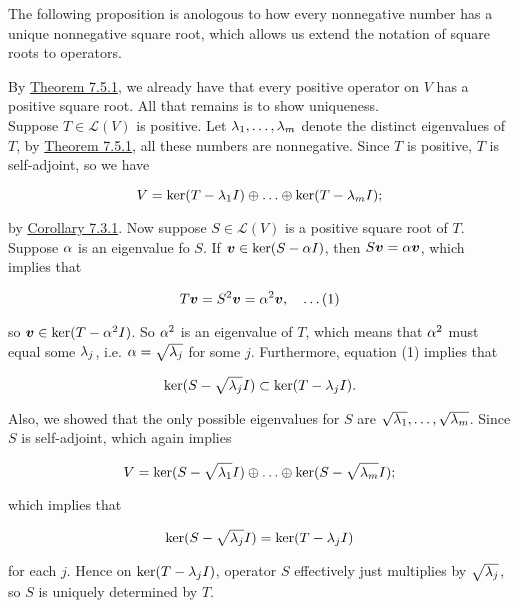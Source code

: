 \documentclass{report}
\newcommand{\cL}{\mathcal{L}}
\begin{document}
	The following proposition is anologous to how every nonnegative number has a unique nonnegative square root, which allows us extend the notation of square roots to operators.
	\vspace{1mm}
	\begin{myproof}
		By \hyperref[sec:Thm751]{Theorem 7.5.1}, we already have that every positive operator on $V$ has a positive square root. All that remains is to show uniqueness.\\
		
		Suppose $T\in\cL(V)$ is positive. Let $\lambda_1,\ldots,\lambda_m$ denote the distinct eigenvalues of $T$, by \hyperref[sec:Thm751]{Theorem 7.5.1}, all these numbers are nonnegative. Since $T$ is positive, $T$ is self-adjoint, so we have
		
		$$V=\ker(T-\lambda_1I)\oplus\ldots\oplus\ker(T-\lambda_mI);$$
		
		by \hyperref[sec:Cor5]{Corollary 7.3.1}. Now suppose $S\in\cL(V)$ is a positive square root of $T$. Suppose $\alpha$ is an eigenvalue fo $S$. If $\boldsymbol{v}\in\ker(S-\alpha I)$, then $S\boldsymbol{v}=\alpha\boldsymbol{v}$, which implies that
		
		$$T\boldsymbol{v}=S^2\boldsymbol{v}=\alpha^2\boldsymbol{v},\quad\ldots(1)$$
		
		so $\boldsymbol{v}\in\ker(T-\alpha^2I)$. So $\alpha^2$ is an eigenvalue of $T$, which means that $\alpha^2$ must equal some $\lambda_j$, i.e. $\alpha=\sqrt{\lambda_j}$ for some $j$. Furthermore, equation (1) implies that 
		
		$$\ker(S-\sqrt{\lambda_j}I)\subset\ker(T-\lambda_jI).$$
		
		Also, we showed that the only possible eigenvalues for $S$ are $\sqrt{\lambda_1},\ldots,\sqrt{\lambda_m}$. Since $S$ is self-adjoint, which again implies
		
		$$V=\ker(S-\sqrt{\lambda_1}I)\oplus\ldots\oplus\ker(S-\sqrt{\lambda_m}I);$$
		
		which implies that 
		
		$$\ker(S-\sqrt{\lambda_j}I)=\ker(T-\lambda_jI)$$
		
		for each $j$. Hence on $\ker(T-\lambda_jI)$, operator $S$ effectively just multiplies by $\sqrt{\lambda_j}$, so $S$ is uniquely determined by $T$.
	\end{myproof}
	
\end{document}
